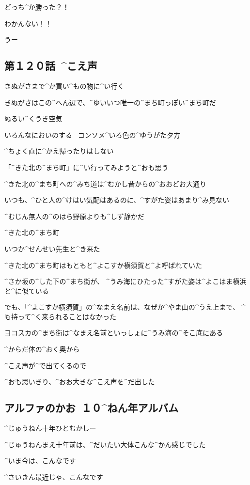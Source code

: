 \page[136]
\Maruko どっち^{か}{勝}った？！

\Alpha わかんない！！

\Kokone うー


\subsection{第１２０話\ ^{こえ}{声}}

\page[138]
\Alpha きぬがさまで^{か}{買}い^{もの}{物}に^{い}{行}く

\Alpha きぬがさはこの^{へん}{辺}で、^{ゆいいつ}{唯一}の^{まち}{町}っぽい^{まち}{町}だ

\page[140]
\Alpha ぬるい^{くうき}{空気}

\Alpha いろんなにおいのする
\ コンソメ^{いろ}{色}の^{ゆうがた}{夕方}

\Alpha ^{ちょく}{直}に^{かえ}{帰}ったりはしない

\Alpha 「^{きた}{北}の^{まち}{町}」に^{い}{行}ってみようと^{おも}{思}う

\page
\Alpha ^{きた}{北}の^{まち}{町}への^{みち}{道}は^{むかし}{昔}からの^{おおどお}{大通}り

\Alpha いつも、^{ひと}{人}の^{けはい}{気配}はあるのに、^{すがた}{姿}はあまり^{み}{見}ない

\Alpha ^{むじん}{無人}の^{のはら}{野原}よりも^{しず}{静}かだ

\page[143]
\Alpha ^{きた}{北}の^{まち}{町}

\Alpha いつか^{せんせい}{先生}と^{き}{来}た

\page
\Alpha ^{きた}{北}の^{まち}{町}はもともと^{よこすか}{横須賀}と^{よ}{呼}ばれていた

\Alpha ^{さか}{坂}の^{した}{下}の^{まち}{街}が、
^{うみ}{海}にひたった^{すがた}{姿}は^{よこはま}{横浜}と^{に}{似}ている

\Alpha でも、「^{よこすか}{横須賀}」の^{なまえ}{名前}は、なぜか^{やま}{山}の^{うえ}{上}まで、
^{も}{持}って^{く}{来}られることはなかった

\page
\Alpha ヨコスカの^{まち}{街}は^{なまえ}{名前}といっしょに^{うみ}{海}の^{そこ}{底}にある

\page[147]
\Alpha ^{からだ}{体}の^{おく}{奥}から

\page
\Alpha ^{こえ}{声}が^{で}{出}てくるので

\Alpha ^{おも}{思}いきり、^{おお}{大}きな^{こえ}{声}を^{だ}{出}した



\subsection{アルファのかお\ １０^{ねん}{年}アルバム}

\Alpha ^{じゅうねん}{十年}ひとむかしー

\Alpha ^{じゅうねんまえ}{十年前}は、^{だいたい}{大体}こんな^{かん}{感}じでした

\Alpha ^{いま}{今}は、こんなです

\Alpha ^{さいきん}{最近}じゃ、こんなです
